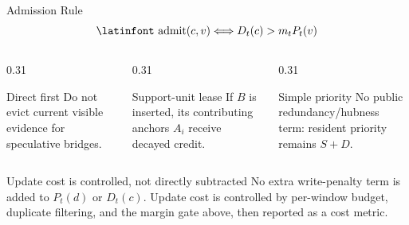 \documentclass[aspectratio=169,10pt]{beamer}
\newcommand{\en}[1]{{\latinfont #1}}
\newcommand{\mop}[1]{\mathop{\text{\en{#1}}}}
\begin{document}
\begin{frame}{Admission Rule}
  \centering
  \[
    \mop{admit}(c,v)
    \Longleftrightarrow
    D_t(c)>m_t P_t(v)
  \]

  \vspace{0.5em}
  \begin{columns}[T]
    \begin{column}{0.31\textwidth}
      \begin{block}{Direct first}
        \small
        Do not evict current visible evidence for speculative bridges.
      \end{block}
    \end{column}
    \begin{column}{0.31\textwidth}
      \begin{block}{Support-unit lease}
        \small
        If $B$ is inserted, its contributing anchors $A_i$ receive decayed credit.
      \end{block}
    \end{column}
    \begin{column}{0.31\textwidth}
      \begin{block}{Simple priority}
        \small
        No public redundancy/hubness term:
        resident priority remains $S+D$.
      \end{block}
    \end{column}
  \end{columns}

  \vspace{0.35em}
  \begin{alertblock}{Update cost is controlled, not directly subtracted}
    No extra write-penalty term is added to $P_t(d)$ or $D_t(c)$.
    Update cost is controlled by per-window budget, duplicate filtering,
    and the margin gate above, then reported as a cost metric.
  \end{alertblock}
\end{frame}
\end{document}
